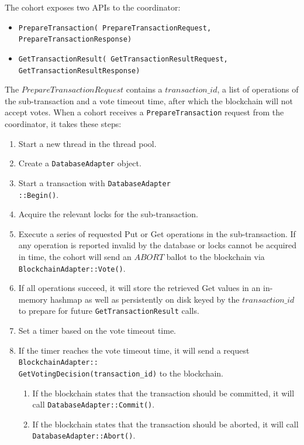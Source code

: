 \documentclass[11pt,conference]{IEEEtran}
\begin{document}
The cohort exposes two APIs to the coordinator:
\begin{itemize}
  \item \texttt{PrepareTransaction(
    PrepareTransactionRequest, PrepareTransactionResponse)}
  \item \texttt{GetTransactionResult(
    GetTransactionResultRequest, GetTransactionResultResponse)}
\end{itemize} 

The $PrepareTransactionRequest$ contains a $transaction\_id$, a list of operations of the sub-transaction and a vote timeout time, after which the blockchain will not accept votes. When a cohort receives a \texttt{PrepareTransaction} request from the coordinator, it takes these steps: 
\begin{enumerate}
  \item Start a new thread in the thread pool.
  \item Create a \texttt{DatabaseAdapter} object.
  \item Start a transaction with 
  \texttt{DatabaseAdapter\\::Begin()}. 
  \item Acquire the relevant locks for the sub-transaction. 
  \item Execute a series of requested Put or Get operations in the sub-transaction. 
If any operation is reported invalid by the database or locks cannot be acquired in time, the cohort will send an $ABORT$ ballot to the blockchain via \texttt{BlockchainAdapter::Vote()}.
  \item If all operations succeed, it will store the retrieved Get values in an in-memory hashmap as well as persistently on disk keyed by the $transaction\_id$ to prepare for future \texttt{GetTransactionResult} calls.
  \item Set a timer based on the vote timeout time.
  \item If the timer reaches the vote timeout time, it will send a request \texttt{BlockchainAdapter::\\GetVotingDecision(transaction\_id)} to the blockchain. 
  \begin{enumerate}
    \item If the blockchain states that the transaction should be committed, it will call \texttt{DatabaseAdapter::Commit()}.
    \item If the blockchain states that the transaction should be aborted, it will call \texttt{DatabaseAdapter::Abort()}.
  \end{enumerate}
  
\end{enumerate}
\end{document}
